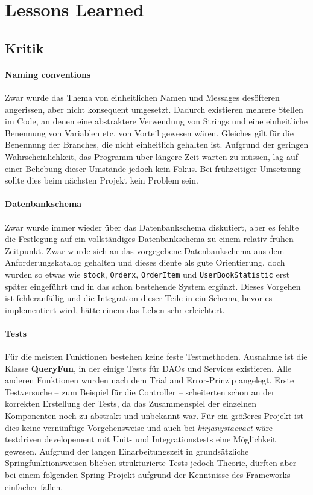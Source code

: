 \section{Lessons Learned}

	\subsection{Kritik}
	
	\paragraph{Naming conventions} Zwar wurde das Thema von einheitlichen Namen und Messages desöfteren angerissen, aber nicht konsequent umgesetzt. Dadurch existieren mehrere Stellen im Code, an denen eine abstraktere Verwendung von Strings und eine einheitliche Benennung von Variablen etc. von Vorteil gewesen wären. Gleiches gilt für die Benennung der Branches, die nicht einheitlich gehalten ist. Aufgrund der geringen Wahrscheinlichkeit, das Programm über längere Zeit warten zu müssen, lag auf einer Behebung dieser Umstände jedoch kein Fokus. Bei frühzeitiger Umsetzung sollte dies beim nächsten Projekt kein Problem sein.
	
	\paragraph{Datenbankschema} Zwar wurde immer wieder über das Datenbankschema diskutiert, aber es fehlte die Festlegung auf ein vollständiges Datenbankschema zu einem relativ frühen Zeitpunkt. Zwar wurde sich an das vorgegebene Datenbankschema aus dem Anforderungskatalog gehalten und dieses diente als gute Orientierung, doch wurden so etwas wie \texttt{stock}, \texttt{Orderx}, \texttt{OrderItem} und \texttt{UserBookStatistic} erst später eingeführt und in das schon bestehende System ergänzt. Dieses Vorgehen ist fehleranfällig und die Integration dieser Teile in ein Schema, bevor es implementiert wird, hätte einem das Leben sehr erleichtert.
	
	\paragraph{Tests} Für die meisten Funktionen bestehen keine feste Testmethoden. Ausnahme ist die Klasse \textbf{QueryFun}, in der einige Tests für DAOs und Services existieren. Alle anderen Funktionen wurden nach dem Trial and Error-Prinzip angelegt. Erste Testversuche -- zum Beispiel für die Controller -- scheiterten schon an der korrekten Erstellung der Tests, da das Zusammenspiel der einzelnen Komponenten noch zu abstrakt und unbekannt war. Für ein größeres Projekt ist dies keine vernünftige Vorgehensweise und auch bei \textit{kirjanystaevaet} wäre testdriven developement mit Unit- und Integrationstests eine Möglichkeit gewesen. Aufgrund der langen Einarbeitungszeit in grundsätzliche Springfunktionsweisen blieben strukturierte Tests jedoch Theorie, dürften aber bei einem folgenden Spring-Projekt aufgrund der Kenntnisse des Frameworks einfacher fallen.

